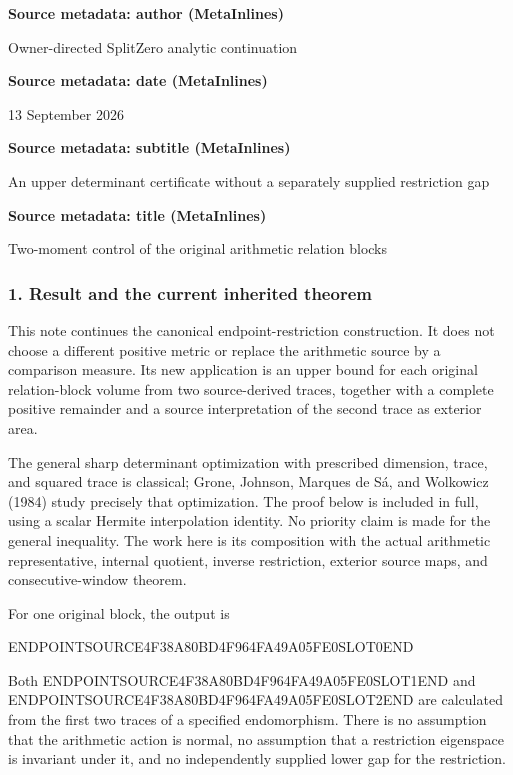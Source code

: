 \textbf{Source metadata: author (MetaInlines)}

Owner-directed SplitZero analytic continuation

\textbf{Source metadata: date (MetaInlines)}

13 September 2026

\textbf{Source metadata: subtitle (MetaInlines)}

An upper determinant certificate without a separately supplied restriction gap

\textbf{Source metadata: title (MetaInlines)}

Two-moment control of the original arithmetic relation blocks

\subsubsection{1. Result and the current inherited theorem}\label{endpoint-relation_moment_original--result-and-the-current-inherited-theorem}

This note continues the canonical endpoint-restriction construction. It does not choose a different positive metric or replace the arithmetic source by a comparison measure. Its new application is an upper bound for each original relation-block volume from two source-derived traces, together with a complete positive remainder and a source interpretation of the second trace as exterior area.

The general sharp determinant optimization with prescribed dimension, trace, and squared trace is classical; Grone, Johnson, Marques de Sá, and Wolkowicz (1984) study precisely that optimization. The proof below is included in full, using a scalar Hermite interpolation identity. No priority claim is made for the general inequality. The work here is its composition with the actual arithmetic representative, internal quotient, inverse restriction, exterior source maps, and consecutive-window theorem.

For one original block, the output is

ENDPOINTSOURCE4F38A80BD4F964FA49A05FE0SLOT0END

Both ENDPOINTSOURCE4F38A80BD4F964FA49A05FE0SLOT1END and ENDPOINTSOURCE4F38A80BD4F964FA49A05FE0SLOT2END are calculated from the first two traces of a specified endomorphism. There is no assumption that the arithmetic action is normal, no assumption that a restriction eigenspace is invariant under it, and no independently supplied lower gap for the restriction.

